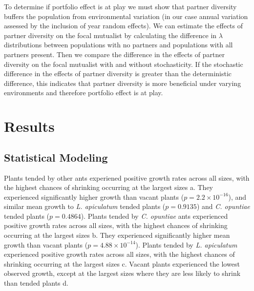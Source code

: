 \documentclass[11pt]{article}
\begin{document}
To determine if portfolio effect is at play we must show that partner diversity buffers the population from environmental variation (in our case annual variation assessed by the inclusion of year random effects). 
We can estimate the effects of partner diversity on the focal mutualist by calculating the difference in $\lambda$ distributions between populations with no partners and populations with all partners present.
Then we compare the difference in the effects of partner diversity on the focal mutualist with and without stochasticity.
If the stochastic difference in the effects of partner diversity is greater than the deterministic difference, this indicates that partner diversity is more beneficial under varying environments and therefore portfolio effect is at play.  
  
\section*{Results}
\subsection*{Statistical Modeling}

Plants tended by other ants experiened positive growth rates across all sizes, with the highest chances of shrinking occurring at the largest sizes \cite{fig:growth}a.
They experienced significantly higher growth than vacant plants ($p = 2.2 \times 10^{-16}$), and similar mean growth to \textit{L. apiculatum} tended plants ($p = 0.9135$) and \textit{C. opuntiae} tended plants ($p = 0.4864$).  
Plants tended by \textit{C. opuntiae} ants experienced positive growth rates across all sizes, with the highest chances of shrinking occurring at the largest sizes \cite{fig:growth}b.
They experienced significantly higher mean growth than vacant plants ($p = 4.88 \times 10^{-14}$).
Plants tended by \textit{L. apiculatum} experienced positive growth rates across all sizes, with the highest chances of shrinking occurring at the largest sizes \cite{fig:growth}c.
Vacant plants experienced the lowest observed growth, except at the largest sizes where they are less likely to shrink than tended plants \cite{fig:growth}d. 
\end{document}

